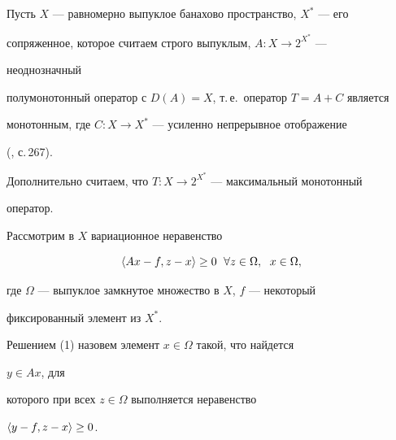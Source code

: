  


\date{} 




\pagestyle{plain} %


 




\maketitle 


\label{begin} 


 


Пусть $X$ --- равномерно выпуклое банахово пространство, $X^*$ --- его 


сопряженное, которое считаем строго выпуклым, $A:X\to 2^{X^*}$ --- 


неоднозначный 


полумонотонный оператор с $D(A)=X$, т.\,е.~оператор $T=A+C$ является 


монотонным, где $C:X\to X^*$ --- усиленно непрерывное отображение 


(\cite{1}, с.\,267). 


Дополнительно считаем, что $T:X\to2^{X^*}$ --- максимальный монотонный 


оператор. 


 


Рассмотрим в $X$ вариационное неравенство 


\begin{equation} 


\la Ax-f,z-x\ra\ge 0\ \;\forall z\in\Omega,\ \; x\in\Omega, 


\end{equation} 


где $\Omega$ --- выпуклое замкнутое множество в $X$, $f$ --- некоторый 


фиксированный элемент из $X^*$. 


 


Решением (1) назовем элемент $x\in\Omega$ такой, что найдется 


$y\in Ax$, для 


которого при всех $z\in\Omega$ выполняется неравенство 


$\langle y-f,z-x\rangle\ge 0$. 


